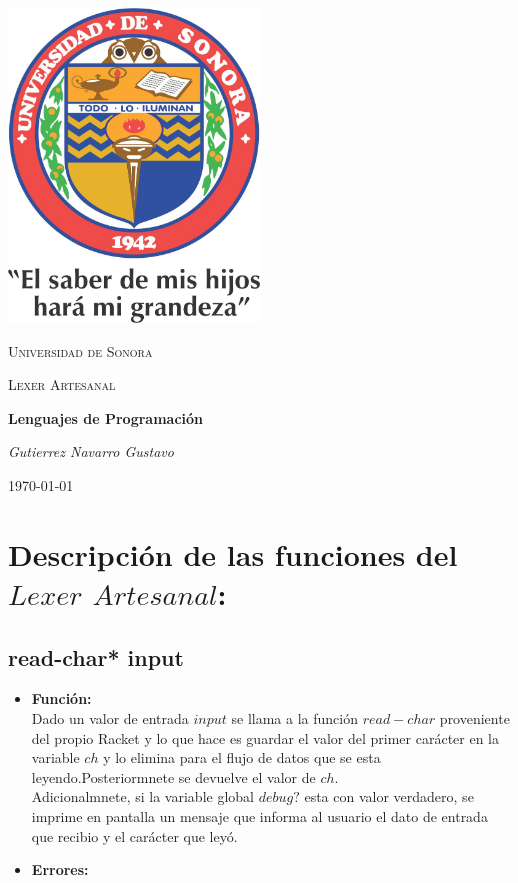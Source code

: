 \documentclass{article}
\begin{document}
\begin{titlepage}
	\centering
	\includegraphics[width=0.5\textwidth]{unisonlogo.jpg}\par\vspace{1cm}
	{\scshape\LARGE Universidad de Sonora\par}
	\vspace{1cm}
	{\scshape\Large Lexer Artesanal\par}
	\vspace{1.5cm}
	{\huge\bfseries Lenguajes de Programación\par}
	\vspace{2cm}
	{\Large\itshape Gutierrez Navarro Gustavo\par}
	\vfill
	\vfill
	{\large \today\par}
\end{titlepage}
\section{Descripción de las funciones del $Lexer$ $Artesanal$:}
\subsection{read-char* input}
\begin{itemize}
    \item \textbf{Función:} \\
    Dado un valor de entrada $input$ se llama a la función $read-char$ proveniente del propio Racket y lo que hace es guardar el valor del primer carácter en la variable $ch$ y lo elimina para el flujo de datos que se esta leyendo.Posteriormnete se devuelve el valor de $ch$.\\
    Adicionalmnete, si la variable global $debug?$ esta con valor verdadero, se imprime en pantalla un mensaje que informa al usuario el dato de entrada que recibio y el carácter que leyó.
    \item \textbf{Errores:} \\ 
    
\end{itemize}
\end{document}
